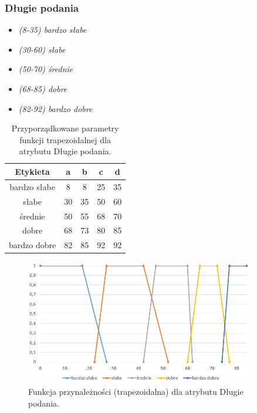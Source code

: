 \documentclass{classrep}
\begin{document}
	\subsubsection{Długie podania}
	\begin{itemize}
		\item \textsl{(8-35) bardzo słabe}
		\item \textsl{(30-60) słabe}
		\item \textsl{(50-70) średnie}
		\item \textsl{(68-85) dobre}
		\item \textsl{(82-92) bardzo dobre}
	\end{itemize}
	\begin{table}[h!]
		\centering
		\begin{tabular} {c c c c c}
			\hline
			\textbf{Etykieta} & \textbf{a} & \textbf{b} & \textbf{c} & \textbf{d} \\ [0.5ex] 
			\hline	
			\hline 
			bardzo słabe & 8 & 8 & 25 &	35 \\
			słabe & 30 & 35 & 50 & 60  \\
			średnie & 50 & 55 & 68 & 70  \\
			dobre & 68 & 73 & 80 & 85  \\
			bardzo dobre & 82 & 85 & 92 & 92  \\	
			\hline
		\end{tabular}
		\caption{Przyporządkowane parametry funkcji trapezoidalnej dla atrybutu Długie podania. }
		\label{tabelaPodania}
	\end{table}
	\begin{figure}[h!]
		\centering
		\includegraphics[width=0.9\textwidth]{zmienne/8.png}
		\caption{Funkcja przynależności (trapezoidalna) dla atrybutu Długie podania.}
		\label{wykresPodania}
	\end{figure}

	\newpage
\end{document}

